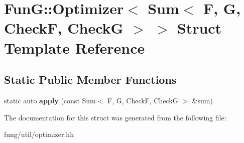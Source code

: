 \hypertarget{structFunG_1_1Optimizer_3_01Sum_3_01F_00_01G_00_01CheckF_00_01CheckG_01_4_01_4}{\section{Fun\-G\-:\-:Optimizer$<$ Sum$<$ F, G, Check\-F, Check\-G $>$ $>$ Struct Template Reference}
\label{structFunG_1_1Optimizer_3_01Sum_3_01F_00_01G_00_01CheckF_00_01CheckG_01_4_01_4}
}
\subsection*{Static Public Member Functions}
\begin{DoxyCompactItemize}
\item 
\hypertarget{structFunG_1_1Optimizer_3_01Sum_3_01F_00_01G_00_01CheckF_00_01CheckG_01_4_01_4_aadf43fb977c08c1b144fb45707302c41}{static auto {\bfseries apply} (const Sum$<$ F, G, Check\-F, Check\-G $>$ \&sum)}\label{structFunG_1_1Optimizer_3_01Sum_3_01F_00_01G_00_01CheckF_00_01CheckG_01_4_01_4_aadf43fb977c08c1b144fb45707302c41}

\end{DoxyCompactItemize}


The documentation for this struct was generated from the following file\-:\begin{DoxyCompactItemize}
\item 
fung/util/optimizer.\-hh\end{DoxyCompactItemize}
